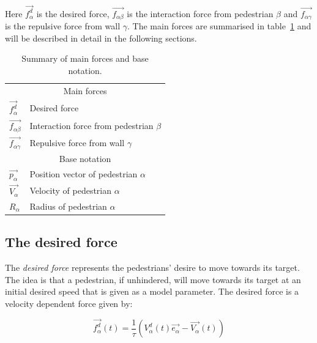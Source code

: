 Here $\overrightarrow{f_{\alpha}^{d}}$ is the desired force,  
$\overrightarrow{f_{\alpha \beta}}$ is the interaction force from pedestrian 
$\beta$ and $\overrightarrow{f_{\alpha \gamma}}$ is the repulsive force from 
wall $\gamma$. The main forces are summarised in table~\ref{tbl:main-forces} 
and will be described in detail in the following sections.

\begin{table}[h]
    \centering
    \begin{tabular}{l l}
        \toprule
        \multicolumn{2}{c}{\textsf{Main forces}}\\
        $\overrightarrow{f_{\alpha}^{d}}$ & Desired force\\
        $\overrightarrow{f_{\alpha \beta}}$ & Interaction force from pedestrian 
        $\beta$\\
        $\overrightarrow{f_{\alpha \gamma}}$ & Repulsive force from wall 
        $\gamma$\\
        \midrule
        \multicolumn{2}{c}{\textsf{Base notation}}\\
        $\overrightarrow{p_{\alpha}}$ & Position vector of pedestrian 
        $\alpha$\\
        $\overrightarrow{V_{\alpha}}$ & Velocity of pedestrian $\alpha$ \\ 
        \addlinespace[0.3em]
        $R_\alpha$ & Radius of pedestrian $\alpha$\\
        \bottomrule
    \end{tabular}
    \caption{Summary of main forces and base notation.}
    \label{tbl:main-forces}
\end{table}

\subsection{The desired force}
\label{sec:desired-force}
The \emph{desired force} represents the pedestrians' desire to move towards its 
target. The idea is that a pedestrian, if unhindered, will move towards its 
target at an initial desired speed that is given as a model parameter. The 
desired force is a velocity dependent force given by:

\begin{equation}\label{eqn:desired-force}
	\overrightarrow{f^{d}_{\alpha}} (t) =
    \frac{1}{\tau}
    \left( V_{\alpha}^{d}(t) \overrightarrow{e_{\alpha}} - 
    \overrightarrow{V_{\alpha}}(t) \right)
\end{equation}

